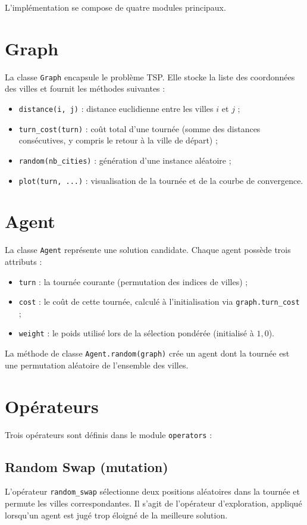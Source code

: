 \documentclass[12pt,a4paper]{report}
\begin{document}
L'implémentation se compose de quatre modules principaux.

\section{Graph}
La classe \texttt{Graph} encapsule le problème TSP. Elle stocke la liste
des coordonnées des villes et fournit les méthodes suivantes :
\begin{itemize}
	\item \texttt{distance(i, j)} : distance euclidienne entre les villes $i$ et $j$ ;
	\item \texttt{turn\_cost(turn)} : coût total d'une tournée (somme des distances
	      consécutives, y compris le retour à la ville de départ) ;
	\item \texttt{random(nb\_cities)} : génération d'une instance aléatoire ;
	\item \texttt{plot(turn, ...)} : visualisation de la tournée et de la courbe
	      de convergence.
\end{itemize}

\section{Agent}
La classe \texttt{Agent} représente une solution candidate. Chaque agent
possède trois attributs :
\begin{itemize}
	\item \texttt{turn} : la tournée courante (permutation des indices de villes) ;
	\item \texttt{cost} : le coût de cette tournée, calculé à l'initialisation
	      via \texttt{graph.turn\_cost} ;
	\item \texttt{weight} : le poids utilisé lors de la sélection pondérée
	      (initialisé à $1{,}0$).
\end{itemize}
La méthode de classe \texttt{Agent.random(graph)} crée un agent dont la
tournée est une permutation aléatoire de l'ensemble des villes.

\section{Opérateurs}
Trois opérateurs sont définis dans le module \texttt{operators} :

\subsection{Random Swap (mutation)}
L'opérateur \texttt{random\_swap} sélectionne deux positions aléatoires
dans la tournée et permute les villes correspondantes. Il s'agit de
l'opérateur d'exploration, appliqué lorsqu'un agent est jugé trop
éloigné de la meilleure solution.
\end{document}

